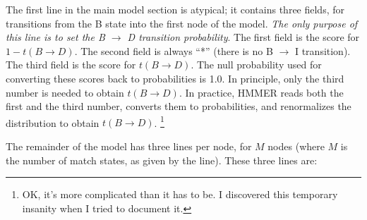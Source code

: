 The first line in the main model section is atypical; it contains
three fields, for transitions from the B state into the first node of
the model. \textit{The only purpose of this line is to set the B
$\rightarrow$ D transition probability}. The first field is the score
for $ 1 - t(B \rightarrow D)$. The second field is always ``*'' (there
is no B $\rightarrow$ I transition). The third field is the score for
$t(B\rightarrow D)$. The null probability used for converting these
scores back to probabilities is 1.0. In principle, only the third
number is needed to obtain $t(B \rightarrow D)$.  In practice, HMMER
reads both the first and the third number, converts them to
probabilities, and renormalizes the distribution to obtain $t(B
\rightarrow D)$. \footnote{OK, it's more complicated than it has to
be. I discovered this temporary insanity when I tried to document it.}

The remainder of the model has three lines per node, for $M$ nodes
(where $M$ is the number of match states, as given by the 
line). These three lines are:

